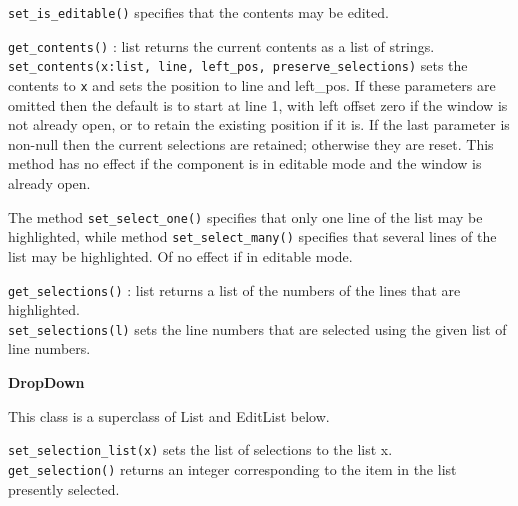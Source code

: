 \texttt{set\_is\_editable()} specifies that the contents may be edited.

\texttt{get\_contents()} : list returns the current contents as a list of
strings.\\
\texttt{set\_contents(x:list, line, left\_pos, preserve\_selections)} sets the
contents to \texttt{x} and sets the position to line and left\_pos. If
these parameters are omitted then the default is to start at line 1,
with left offset zero if the window is not already open, or to retain
the existing position if it is. If the last parameter is non-null then
the current selections are retained; otherwise they are reset. This
method has no effect if the component is in editable mode and the
window is already open.


The method \texttt{set\_select\_one()} specifies that only one line of the list
may be highlighted, while method \texttt{set\_select\_many()} specifies that
several lines of the list may be highlighted. Of no effect if in editable mode.

\texttt{get\_selections()} : list returns a list of the numbers of the lines
that are highlighted.\\
\texttt{set\_selections(l)} sets the line numbers that are selected using the
given list of line numbers.


{\ttfamily\bfseries
{}DropDown}

This class is a superclass of List and EditList below.

\texttt{set\_selection\_list(x)} sets the list of selections to the list
x.\\
\texttt{get\_selection()} returns an integer corresponding to the item in the
list presently selected.

